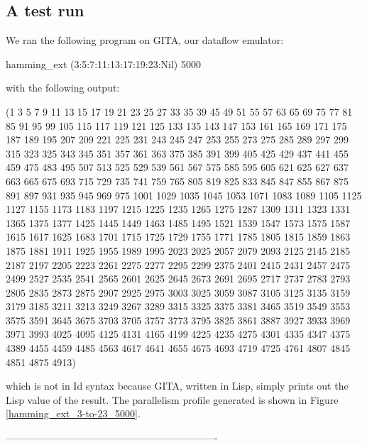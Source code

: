 \subsection{A test run}

We ran the following program on GITA, our dataflow emulator:

\beginid
hamming\_ext (3:5:7:11:13:17:19:23:Nil) 5000
\endid

with the following output:
\beginid

(1 3 5 7 9 11 13 15 17 19 21 23 25 27 33 35 39 45 49 51 55 57 63 65 69
75 77 81 85 91 95 99 105 115 117 119 121 125 133 135 143 147 153 161
165 169 171 175 187 189 195 207 209 221 225 231 243 245 247 253 255
273 275 285 289 297 299 315 323 325 343 345 351 357 361 363 375 385
391 399 405 425 429 437 441 455 459 475 483 495 507 513 525 529 539
561 567 575 585 595 605 621 625 627 637 663 665 675 693 715 729 735
741 759 765 805 819 825 833 845 847 855 867 875 891 897 931 935 945
969 975 1001 1029 1035 1045 1053 1071 1083 1089 1105 1125 1127 1155
1173 1183 1197 1215 1225 1235 1265 1275 1287 1309 1311 1323 1331 1365
1375 1377 1425 1445 1449 1463 1485 1495 1521 1539 1547 1573 1575 1587
1615 1617 1625 1683 1701 1715 1725 1729 1755 1771 1785 1805 1815 1859
1863 1875 1881 1911 1925 1955 1989 1995 2023 2025 2057 2079 2093 2125
2145 2185 2187 2197 2205 2223 2261 2275 2277 2295 2299 2375 2401 2415
2431 2457 2475 2499 2527 2535 2541 2565 2601 2625 2645 2673 2691 2695
2717 2737 2783 2793 2805 2835 2873 2875 2907 2925 2975 3003 3025 3059
3087 3105 3125 3135 3159 3179 3185 3211 3213 3249 3267 3289 3315 3325
3375 3381 3465 3519 3549 3553 3575 3591 3645 3675 3703 3705 3757 3773
3795 3825 3861 3887 3927 3933 3969 3971 3993 4025 4095 4125 4131 4165
4199 4225 4235 4275 4301 4335 4347 4375 4389 4455 4459 4485 4563 4617
4641 4655 4675 4693 4719 4725 4761 4807 4845 4851 4875 4913)

\endid

which is not in Id syntax because GITA, written in Lisp, simply
prints out the Lisp value of the result.  The parallelism profile
generated is shown in Figure \ref{hamming_ext_3-to-23_5000}.

 \begin{figure}[htbp]
 \end{figure}
----------------------------------------------------------------

